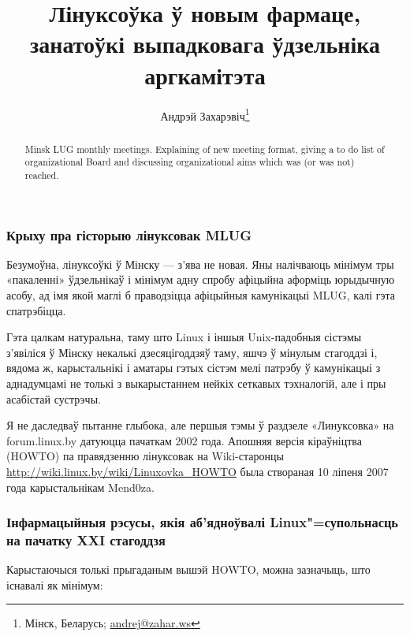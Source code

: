 \documentclass[10pt, a5paper]{article}
\begin{document}

\title{Лінуксоўка ў новым фармаце, занатоўкі выпадковага ўдзельніка аргкамітэта}%

\author{Андрэй Захарэвіч\footnote{Мінск, Беларусь; \url{andrej@zahar.ws}}}
\maketitle

\begin{abstract}
Minsk LUG monthly meetings. Explaining of new meeting format, giving a to do list of organizational Board and discussing organiza\-tional aims which was (or was not) reached.
\end{abstract}

\subsubsection*{Крыху пра гісторыю лінуксовак MLUG}

Безумоўна, лінуксоўкі ў Мінску — з'ява не новая. Яны налічваюць мінімум тры «пакаленні» ўдзельнікаў і мінімум адну спробу афіцыйна аформіць юрыдычную асобу, ад імя якой маглі б праводзіцца афіцыйныя камунікацыі MLUG, калі гэта спатрэбіцца.

Гэта цалкам натуральна, таму што Linux і іншыя Unix-падобныя сістэмы з'явіліся ў Мінску некалькі дзесяцігоддзяў таму, яшчэ ў мінулым стагоддзі і, вядома ж, карыстальнікі і аматары гэтых сістэм мелі патрэбу ў камунікацыі з аднадумцамі не толькі з выкарыстаннем нейкіх сеткавых тэхналогій, але і пры асабістай сустрэчы.

Я не даследваў пытанне глыбока, але першыя тэмы ў раздзеле «Линуксовка» на forum.linux.by датуюцца пачаткам 2002 года. Апошняя версія кіраўніцтва (HOWTO) па правядзенню лінуксовак на Wiki-старонцы \url{http://wiki.linux.by/wiki/Linuxovka\_HOWTO} была створаная 10 ліпеня 2007 года карыстальнікам Mend0za.

\subsubsection*{Інфармацыйныя рэсусы, якія аб'ядноўвалі Linux"=супольнасць на пачатку XXI стагоддзя}

Карыстаючыся толькі прыгаданым вышэй HOWTO, можна зазначыць, што існавалі як мінімум:
\end{document}

